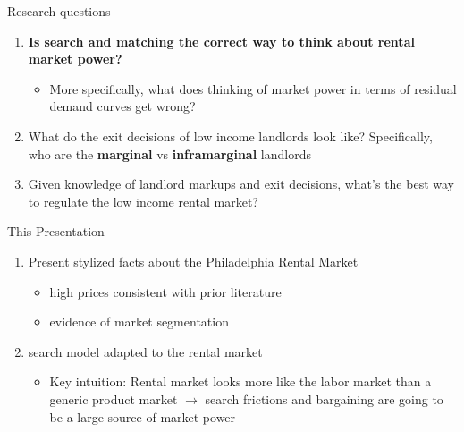 \documentclass[10pt, xcolor=dvipsnames]{beamer}
\begin{document}
\begin{frame}{Research questions}

\begin{enumerate}
    \item \textbf{Is search and matching the correct way to think about rental market power?}
    \begin{itemize}
        \item More specifically, what does thinking of market power in terms of residual demand curves get wrong?
    \end{itemize}
    \pause
    \item What do the exit decisions of low income landlords look like? Specifically, who are the \textbf{marginal} vs \textbf{inframarginal} landlords
    \pause
    \item Given knowledge of landlord markups and exit decisions, what's the best way to regulate the low income rental market?
\end{enumerate}

\end{frame}

\begin{frame}{This Presentation}
    \begin{enumerate}
        \item Present stylized facts about the Philadelphia Rental Market
        \begin{itemize}
            \item high prices consistent with prior literature
            \item evidence of market segmentation
        \end{itemize}
         \pause
        \item \cite{jarosh-search-2024} search model adapted to the rental market
        \pause
        \begin{itemize}
            \item Key intuition: Rental market looks more like the labor market than a generic product market $\rightarrow$ search frictions and bargaining are going to be a large source of market power
        \end{itemize}
    \end{enumerate}
    
\end{frame}


    
\end{document}
